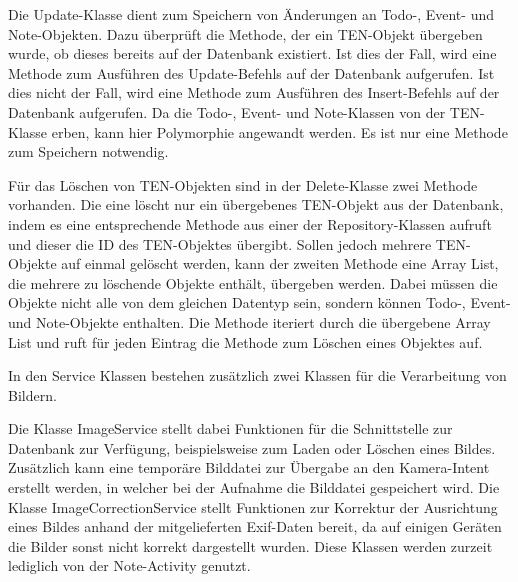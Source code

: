 Die Update-Klasse dient zum Speichern von Änderungen an Todo-, Event- und Note-Objekten. Dazu überprüft die Methode, der ein TEN-Objekt übergeben wurde, ob dieses bereits auf der Datenbank existiert. Ist dies der Fall, wird eine Methode zum Ausführen des Update-Befehls auf der Datenbank aufgerufen. Ist dies nicht der Fall, wird eine Methode zum Ausführen des Insert-Befehls auf der Datenbank aufgerufen. Da die Todo-, Event- und Note-Klassen von der TEN-Klasse erben, kann hier Polymorphie angewandt werden. Es ist nur eine Methode zum Speichern notwendig.

Für das Löschen von TEN-Objekten sind in der Delete-Klasse zwei Methode vorhanden. Die eine löscht nur ein übergebenes TEN-Objekt aus der Datenbank, indem es eine entsprechende Methode aus einer der Repository-Klassen aufruft und dieser die ID des TEN-Objektes übergibt. Sollen jedoch mehrere TEN-Objekte auf einmal gelöscht werden, kann der zweiten Methode eine Array List, die mehrere zu löschende Objekte enthält, übergeben werden. Dabei müssen die Objekte nicht alle von dem gleichen Datentyp sein, sondern können Todo-, Event- und Note-Objekte enthalten. Die Methode iteriert durch die übergebene Array List und ruft für jeden Eintrag die Methode zum Löschen eines Objektes auf.

In den Service Klassen bestehen zusätzlich zwei Klassen für die Verarbeitung von Bildern.

Die Klasse ImageService stellt dabei Funktionen für die Schnittstelle zur Datenbank zur Verfügung, beispielsweise zum Laden oder Löschen eines Bildes. Zusätzlich kann eine temporäre Bilddatei zur Übergabe an den Kamera-Intent erstellt werden, in welcher bei der Aufnahme die Bilddatei gespeichert wird. Die Klasse ImageCorrectionService stellt Funktionen zur Korrektur der Ausrichtung eines Bildes anhand der mitgelieferten Exif-Daten bereit, da auf einigen Geräten die Bilder sonst nicht korrekt dargestellt wurden. Diese Klassen werden zurzeit lediglich von der Note-Activity genutzt.



